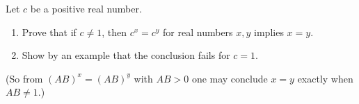 Let $c$ be a positive real number.
\begin{enumerate}
\item[(a)] Prove that if $c\ne1$, then $c^x=c^y$ for real numbers $x,y$ implies $x=y$.
\item[(b)] Show by an example that the conclusion fails for $c=1$.
\end{enumerate}
(So from $(AB)^x=(AB)^y$ with $AB>0$ one may conclude $x=y$ exactly when $AB\ne1$.)
